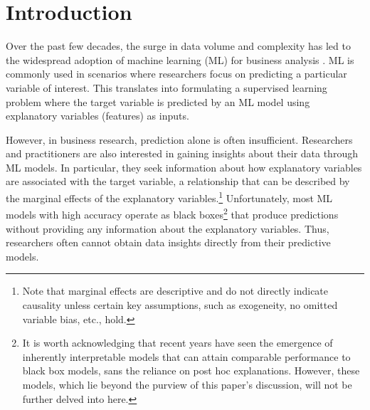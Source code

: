 \documentclass[12pt]{article}  %
\begin{document}
\begin{titlepage}
\begin{abstract}
\vspace{0in}\\
\noindent\textbf{Keywords:} XAI, XML, post-hoc explainers\\
\vspace{0in}\\

\bigskip
\end{abstract}
\setcounter{page}{0}
\thispagestyle{empty}
\end{titlepage}
\pagebreak \newpage

\maketitle
\section{Introduction}

Over the past few decades, the surge in data volume and complexity has led to the widespread adoption of machine learning (ML) for business analysis \citep{kleinberg2015prediction,mullainathan17applied}. ML is commonly used in scenarios where researchers focus on predicting a particular variable of interest. This translates into formulating a supervised learning problem where the target variable is predicted by an ML model using explanatory variables (features) as inputs.

However, in business research, prediction alone is often insufficient. Researchers and practitioners are also interested in gaining insights about their data through ML models. In particular, they seek information about how explanatory variables are associated with the target variable, a relationship that can be described by the marginal effects of the explanatory variables.\footnote{Note that marginal effects are descriptive and do not directly indicate causality unless certain key assumptions, such as exogeneity, no omitted variable bias, etc., hold.} 
Unfortunately, most ML models with high accuracy operate as black boxes\footnote{It is worth acknowledging that recent years have seen the emergence of inherently interpretable models that can attain comparable performance to black box models, sans the reliance on post hoc explanations. However, these models, which lie beyond the purview of this paper's discussion, will not be further delved into here.} that produce predictions without providing any information about the explanatory variables. Thus, researchers often cannot obtain data insights directly from their predictive models.
\end{document}
